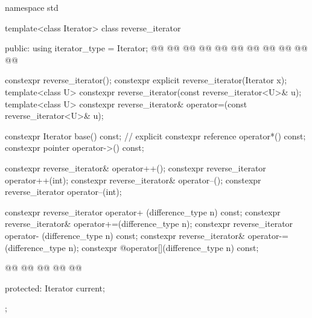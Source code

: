 %
\begin{codeblock}
namespace std {
  template<class Iterator>
  class reverse_iterator {
  public:
    using iterator_type     = Iterator;
    @@
    @@
    @@
    @@
    @@
    @@
    @@
    @@
    @@
    @@
    @@

    constexpr reverse_iterator();
    constexpr explicit reverse_iterator(Iterator x);
    template<class U> constexpr reverse_iterator(const reverse_iterator<U>& u);
    template<class U> constexpr reverse_iterator& operator=(const reverse_iterator<U>& u);

    constexpr Iterator base() const;      // explicit
    constexpr reference operator*() const;
    constexpr pointer   operator->() const;

    constexpr reverse_iterator& operator++();
    constexpr reverse_iterator  operator++(int);
    constexpr reverse_iterator& operator--();
    constexpr reverse_iterator  operator--(int);

    constexpr reverse_iterator  operator+ (difference_type n) const;
    constexpr reverse_iterator& operator+=(difference_type n);
    constexpr reverse_iterator  operator- (difference_type n) const;
    constexpr reverse_iterator& operator-=(difference_type n);
    constexpr @\unspec@ operator[](difference_type n) const;

    @@
      @@
    @@
      @@
        @@

  protected:
    Iterator current;
  };

}
\end{codeblock}
